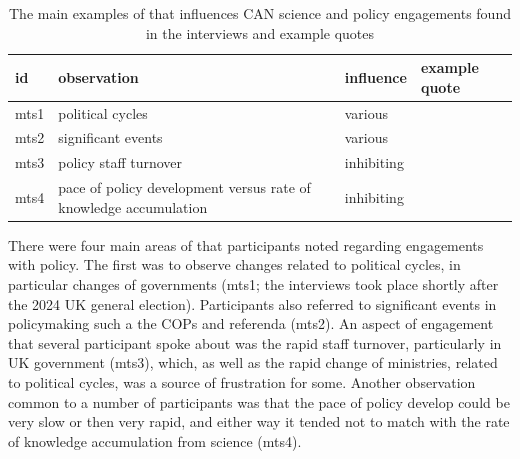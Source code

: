 \begin{table}[!ht]
\footnotesize
\caption{The main examples of \ismmts{} that influences CAN science and policy  engagements found in the interviews and example quotes}\label{tab:restime}
\begin{tabular}{L{.06\linewidth}L{.3\linewidth}L{.12\linewidth}L{.52\linewidth}} \hline
\textbf{id} & \textbf{observation} & \textbf{influence} & \textbf{example quote} \\ \hline \hline 
mts1 & political cycles & various &  \\[5mm]
mts2 & significant events & various &  \\[5mm]
mts3 & policy staff turnover & inhibiting &  \\[5mm]
mts4 & pace of policy development versus rate of knowledge accumulation & inhibiting &  \\[5mm]
 \hline
\end{tabular}
\end{table}

There were four main areas of \ismmts{} that participants noted regarding engagements with policy. The first was to observe changes related to political cycles, in particular changes of governments (mts1; the interviews took place shortly after the 2024 UK general election). Participants also referred to significant events in policymaking such a the COPs and referenda (mts2). An aspect of engagement that several participant spoke about was the rapid staff turnover, particularly in UK government (mts3), which, as well as the rapid change of ministries, related to political cycles, was a source of frustration for some. Another observation common to a number of participants was that the pace of policy develop could be very slow or then very rapid, and either way it tended not to match with the rate of knowledge accumulation from science (mts4). 

